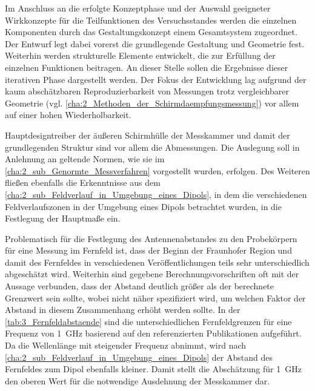 

Im Anschluss an die erfolgte Konzeptphase und der Auswahl geeigneter Wirkkonzepte für die Teilfunktionen des Versuchsstandes werden die einzelnen Komponenten durch das Gestaltungskonzept einem Gesamtsystem zugeordnet. Der Entwurf legt dabei vorerst die grundlegende Gestaltung und Geometrie fest. Weiterhin werden strukturelle Elemente entwickelt, die zur Erfüllung der einzelnen Funktionen beitragen. An dieser Stelle sollen die Ergebnisse dieser iterativen Phase dargestellt werden. Der Fokus der Entwicklung lag aufgrund der kaum abschätzbaren Reproduzierbarkeit von Messungen trotz vergleichbarer Geometrie (vgl. \Abschnitt\ref{cha:2_Methoden_der_Schirmdaempfungsmessung}) vor allem auf einer hohen Wiederholbarkeit.
\par
\vspace{\linespace}
Hauptdesigntreiber der äußeren Schirmhülle der Messkammer und damit der grundlegenden Struktur sind vor allem die Abmessungen. Die Auslegung soll in Anlehnung an geltende Normen, wie sie im \Abschnitt\ref{cha:2_sub_Genormte_Messverfahren} vorgestellt wurden, erfolgen. Des Weiteren fließen ebenfalls die Erkenntnisse aus dem \Abschnitt\ref{cha:2_sub_Feldverlauf_in_Umgebung_eines_Dipols}, in dem die verschiedenen Feldverlaufszonen in der Umgebung eines Dipols betrachtet wurden, in die Festlegung der Hauptmaße ein.
\par
\vspace{\linespace}
Problematisch für die Festlegung des Antennenabstandes zu den Probekörpern für eine Messung im Fernfeld ist, dass der Beginn der Fraunhofer Region und damit des Fernfeldes in verschiedenen Veröffentlichungen teils sehr unterschiedlich abgeschätzt wird. Weiterhin sind gegebene Berechnungsvorschriften oft mit der Aussage verbunden, dass der Abstand deutlich größer als der berechnete Grenzwert sein sollte, wobei nicht näher spezifiziert wird, um welchen Faktor der Abstand in diesem Zusammenhang erhöht werden sollte. In der \Tabelle\ref{tab:3_Fernfeldabstaende} sind die unterschiedlichen Fernfeldgrenzen für eine Frequenz von \SI{1}{\giga\hertz} basierend auf den referenzierten Publikationen aufgeführt. Da die Wellenlänge mit steigender Frequenz abnimmt, wird nach \Abschnitt\ref{cha:2_sub_Feldverlauf_in_Umgebung_eines_Dipols} der Abstand des Fernfeldes zum Dipol ebenfalls kleiner. Damit stellt die Abschätzung für \SI{1}{\giga\hertz} den oberen Wert für die notwendige Ausdehnung der Messkammer dar.


